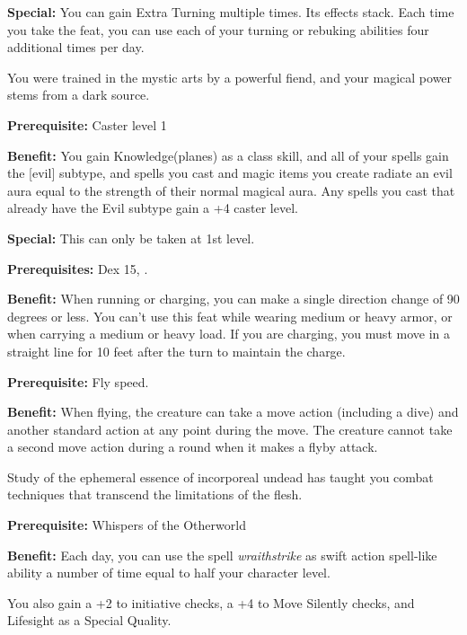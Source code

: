 \textbf{Special:} You can gain Extra Turning multiple times. Its effects stack. Each time you take the feat, you can use each of your turning or rebuking abilities four additional times per day.


You were trained in the mystic arts by a powerful fiend, and your magical power stems from a dark source.

\textbf{Prerequisite:} Caster level 1

\textbf{Benefit:} You gain Knowledge(planes) as a class skill, and all of your spells gain the [evil] subtype, and spells you cast and magic items you create radiate an evil aura equal to the strength of their normal magical aura. Any spells you cast that already have the Evil subtype gain a +4 caster level.

\textbf{Special:} This can only be taken at 1st level.


\textbf{Prerequisites:} Dex 15, .

\textbf{Benefit:} When running or charging, you can make a single direction change of 90 degrees or less. You can't use this feat while wearing medium or heavy armor, or when carrying a medium or heavy load.  If you are charging, you must move in a straight line for 10 feet after the turn to maintain the charge.


\textbf{Prerequisite:} Fly speed.

\textbf{Benefit:} When flying, the creature can take a move action (including a dive) and another standard action at any point during the move. The creature cannot take a second move action during a round when it makes a flyby attack.


Study of the ephemeral essence of incorporeal undead has taught you combat techniques that transcend the limitations of the flesh.

\textbf{Prerequisite:} Whispers of the Otherworld

\textbf{Benefit:} Each day, you can use the spell \textit{wraithstrike} as swift action spell-like ability a number of time equal to half your character level.

You also gain a +2 to initiative checks, a +4 to Move Silently checks, and Lifesight as a Special Quality.

